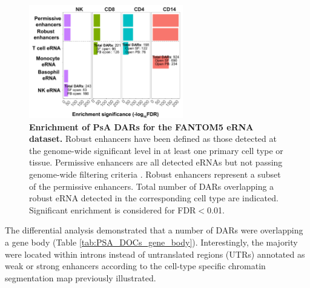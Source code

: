 \begin{figure}[htbp]
\centering
\includegraphics[width=0.6\textwidth]{./Results3/pdfs/ATAC_PsA_FANTOM_enhancer_enrichment_all_cell_types}
\caption[Enrichment of PsA DARs for the FANTOM5 eRNA dataset.]{\textbf{Enrichment of PsA DARs for the FANTOM5 eRNA dataset.} Robust enhancers have been defined as those detected at the genome-wide significant level in at least one primary cell type or tissue. Permissive enhancers are all detected eRNAs but not passing genome-wide filtering criteria \parencite{Andersson2014}. Robust enhancers represent a subset of the permissive enhancers. Total number of DARs overlapping a robust eRNA detected in the corresponding cell type are indicated. Significant enrichment is considered for FDR$<$0.01.}
\label{figure:PSA_FANTOM}
\end{figure}

The differential analysis demonstrated that a number of DARs were overlapping a gene body (Table \ref{tab:PSA_DOCs_gene_body}). Interestingly, the majority were located within introns instead of untranslated regions (UTRs) annotated as weak or strong enhancers according to the cell-type specific chromatin segmentation map previously illustrated. 


